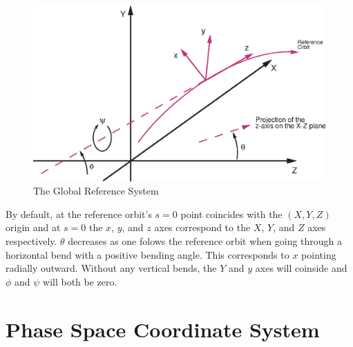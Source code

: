 \begin{figure}
\centering
\includegraphics{global_coords.ps}
\caption{The Global Reference System}
\label{f:global_coords}
\end{figure}

By default, at the reference orbit's $s = 0$ point coincides with the
$(X, Y, Z)$ origin and at $s = 0$ the $x$, $y$, and $z$ axes
correspond to the $X$, $Y$, and $Z$ axes respectively. $\theta$
decreases as one folows the reference orbit when going through a
horizontal bend with a positive bending angle. This corresponds to $x$
pointing radially outward. Without any vertical bends, the $Y$ and $y$
axes will coinside and $\phi$ and $\psi$ will both be zero.

\section{Phase Space Coordinate System}

